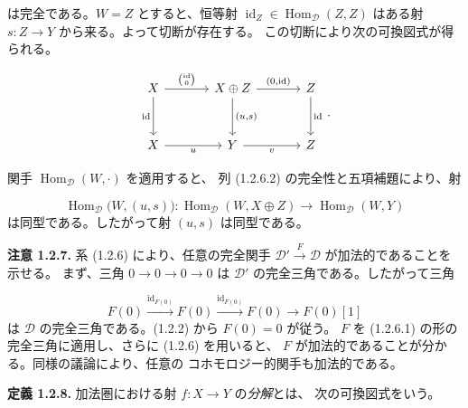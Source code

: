 \clearpage
{}%
\begingroup
\small
\setlength{\abovedisplayskip}{4pt plus 2pt minus 2pt}%
\setlength{\belowdisplayskip}{4pt plus 2pt minus 2pt}%

は完全である。$W=Z$ とすると、恒等射
$\operatorname{id}_Z\in\operatorname{Hom}_{\mathcal D}(Z,Z)$ はある射
$s\colon Z\longrightarrow Y$ から来る。よって切断が存在する。
この切断により次の可換図式が得られる。

\begin{equation*}
  \begin{tikzcd}[column sep=3.5em,row sep=3.0em]
    X \arrow[r,"{\binom{\operatorname{id}}{0}}"]
      \arrow[d,"{\operatorname{id}}"']
      & X\oplus Z \arrow[r,"{(0,\operatorname{id})}"]
        \arrow[d,"{(u,s)}"]
      & Z \arrow[d,"{\operatorname{id}}"] \\
    X \arrow[r,"u"'] & Y \arrow[r,"v"'] & Z
  \end{tikzcd}\,.
\end{equation*}

関手 $\operatorname{Hom}_{\mathcal D}(W,\mathord\cdot)$ を適用すると、
列 (1.2.6.2) の完全性と五項補題により、射

\[
  \operatorname{Hom}_{\mathcal D}\bigl(W,(u,s)\bigr)\colon
  \operatorname{Hom}_{\mathcal D}(W,X\oplus Z)
  \longrightarrow \operatorname{Hom}_{\mathcal D}(W,Y)
\]
は同型である。\space したがって射 $(u,s)$ は同型である。

\medskip
\noindent\textbf{注意 1.2.7.}\quad
系 (1.2.6) により、任意の完全関手
$\mathcal D'\xrightarrow{F}\mathcal D$ が加法的であることを示せる。
まず、三角 $0\longrightarrow0\longrightarrow0\longrightarrow0$ は
$\mathcal D'$ の完全三角である。したがって三角

\[
  F(0)\xrightarrow{\operatorname{id}_{F(0)}}F(0)
  \xrightarrow{\operatorname{id}_{F(0)}}F(0)
  \longrightarrow F(0)[1]
\]
は $\mathcal D$ の完全三角である。(1.2.2) から $F(0)=0$ が従う。
$F$ を (1.2.6.1) の形の完全三角に適用し、さらに (1.2.6) を用いると、
$F$ が加法的であることが分かる。同様の議論により、任意の
コホモロジー的関手も加法的である。

\medskip
\noindent\textbf{定義 1.2.8.}\quad
加法圏における射 $f\colon X\longrightarrow Y$ の\emph{分解}とは、
次の可換図式をいう。

